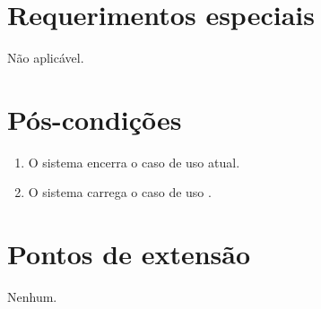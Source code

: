 \section{Requerimentos especiais}

Não aplicável.

\section{Pós-condições}

\begin{enumerate}
	\item O sistema encerra o caso de uso atual.
	\item O sistema carrega o caso de uso .
\end{enumerate}

\section{Pontos de extensão}

Nenhum.